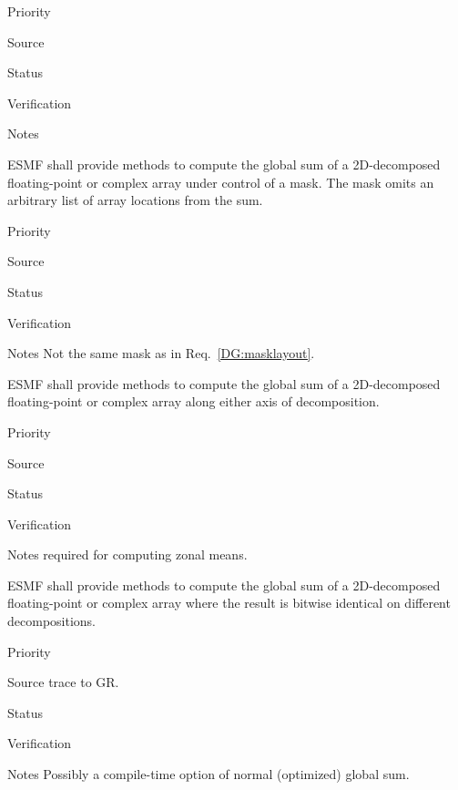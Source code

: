 \begin{reqlist}
\item[Priority]
\item[Source]
\item[Status]
\item[Verification]
\item[Notes]
\end{reqlist}

 \label{DG:masksum}

ESMF shall provide methods to compute the global sum of a 2D-decomposed
floating-point or complex array under control of a mask. The mask
omits an arbitrary list of array locations from the sum.

\begin{reqlist}
\item[Priority]
\item[Source]
\item[Status]
\item[Verification]
\item[Notes] Not the same mask as in Req.~\ref{DG:masklayout}.
\end{reqlist}


ESMF shall provide methods to compute the global sum of a 2D-decomposed
floating-point or complex array along either axis of decomposition.

\begin{reqlist}
\item[Priority]
\item[Source]
\item[Status]
\item[Verification]
\item[Notes] required for computing zonal means.
\end{reqlist}


ESMF shall provide methods to compute the global sum of a
2D-decomposed floating-point or complex array where the result is
bitwise identical on different decompositions.

\begin{reqlist}
\item[Priority]
\item[Source] trace to GR.
\item[Status]
\item[Verification]
\item[Notes] Possibly a compile-time option of normal (optimized)
             global sum.
\end{reqlist}


